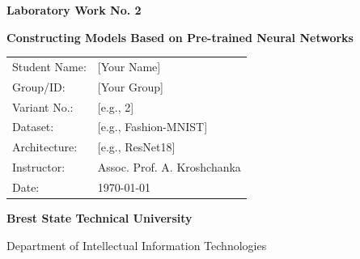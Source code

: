 \documentclass[12pt, a4paper]{article}
\begin{document}
\begin{titlepage}
    \centering
    \vspace*{2cm}
    
    {\Huge \bfseries \textcolor{primary}{Laboratory Work No. 2} \par}
    \vspace{0.5cm}
    {\LARGE \textbf{Constructing Models Based on Pre-trained Neural Networks} \par}
    \vspace{2cm}
    
    \begin{table}[h]
        \centering
        \large
        \renewcommand{\arraystretch}{1.5}
        \begin{tabular}{l l}
            Student Name: & [Your Name] \\
            Group/ID: & [Your Group] \\
            Variant No.: & [e.g., 2] \\
            Dataset: & [e.g., Fashion-MNIST] \\
            Architecture: & [e.g., ResNet18] \\
            Instructor: & Assoc. Prof. A. Kroshchanka \\
            Date: & \today \\
        \end{tabular}
    \end{table}
    
    \vfill
    {\large \textbf{Brest State Technical University} \par}
    {\large Department of Intellectual Information Technologies \par}
    \vspace*{2cm}
\end{titlepage}

\begin{abstract}
    \noindent This report details the process of adapting and fine-tuning a pre-trained neural network using the PyTorch framework. The primary objective is to modify an existing architecture (e.g., ResNet, MobileNet) to fit a specific classification task and evaluate its performance. The report includes data preprocessing (such as handling single-channel images), architecture modification, performance comparison against custom models from Laboratory Work 1, state-of-the-art benchmarking, and model inference visualization on arbitrary images.
\end{abstract}
\end{document}
